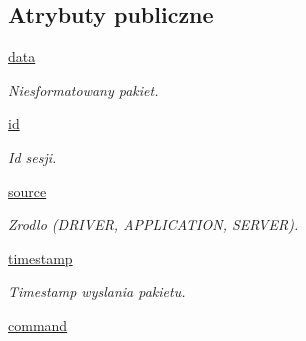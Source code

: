 \subsection*{Atrybuty publiczne}
\begin{CompactItemize}
\item 
\hypertarget{class_serv_1_1_packet_1_1_packet_5c1fb13da3486f574c94aaac06f3c56c}{
\hyperlink{class_serv_1_1_packet_1_1_packet_5c1fb13da3486f574c94aaac06f3c56c}{data}}
\label{class_serv_1_1_packet_1_1_packet_5c1fb13da3486f574c94aaac06f3c56c}

\begin{CompactList}\small\item\em Niesformatowany pakiet. \item\end{CompactList}\item 
\hypertarget{class_serv_1_1_packet_1_1_packet_5cc00710f6a12b310f6b69d88ed51c55}{
\hyperlink{class_serv_1_1_packet_1_1_packet_5cc00710f6a12b310f6b69d88ed51c55}{id}}
\label{class_serv_1_1_packet_1_1_packet_5cc00710f6a12b310f6b69d88ed51c55}

\begin{CompactList}\small\item\em Id sesji. \item\end{CompactList}\item 
\hypertarget{class_serv_1_1_packet_1_1_packet_37864cf9c1e11502ff340f0068ffa7f9}{
\hyperlink{class_serv_1_1_packet_1_1_packet_37864cf9c1e11502ff340f0068ffa7f9}{source}}
\label{class_serv_1_1_packet_1_1_packet_37864cf9c1e11502ff340f0068ffa7f9}

\begin{CompactList}\small\item\em Zrodlo (DRIVER, APPLICATION, SERVER). \item\end{CompactList}\item 
\hypertarget{class_serv_1_1_packet_1_1_packet_f7df973d840761ea9884fdffd800dc27}{
\hyperlink{class_serv_1_1_packet_1_1_packet_f7df973d840761ea9884fdffd800dc27}{timestamp}}
\label{class_serv_1_1_packet_1_1_packet_f7df973d840761ea9884fdffd800dc27}

\begin{CompactList}\small\item\em Timestamp wyslania pakietu. \item\end{CompactList}\item 
\hypertarget{class_serv_1_1_packet_1_1_packet_8a1139cb536fdc04312e50fbeb8e95a0}{
\hyperlink{class_serv_1_1_packet_1_1_packet_8a1139cb536fdc04312e50fbeb8e95a0}{command}}
\label{class_serv_1_1_packet_1_1_packet_8a1139cb536fdc04312e50fbeb8e95a0}


\end{CompactItemize}
